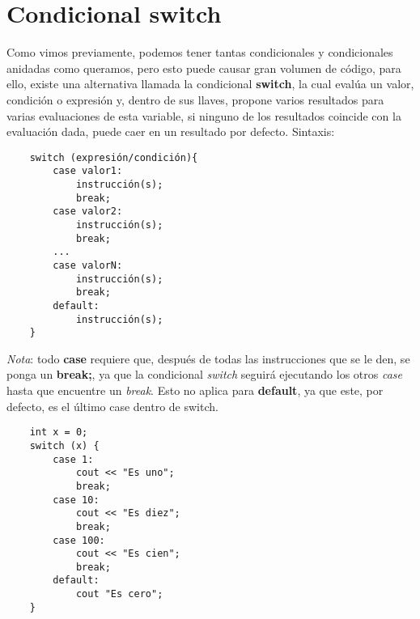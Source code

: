 \section{Condicional switch}
Como vimos previamente, podemos tener tantas condicionales y condicionales anidadas como queramos, pero esto puede causar gran volumen de código, para ello, existe una alternativa llamada la condicional \textbf{switch}, la cual evalúa un valor, condición o expresión y,  dentro de sus llaves, propone varios resultados para varias evaluaciones de esta variable, si ninguno de los resultados coincide con la evaluación dada, puede caer en un resultado por defecto. Sintaxis:
\begin{lstlisting}
    switch (expresión/condición){
        case valor1:
            instrucción(s);
            break;
        case valor2:
            instrucción(s);
            break;
        ...
        case valorN:
            instrucción(s);
            break;
        default:
            instrucción(s);
    }
\end{lstlisting}
\textit{Nota}: todo \textbf{case} requiere que, después de todas las instrucciones que se le den, se ponga un \textbf{break;}, ya que la condicional \textit{switch} seguirá ejecutando los otros \textit{case} hasta que encuentre un \textit{break}. Esto no aplica para \textbf{default}, ya que este, por defecto, es el último case dentro de switch.
\begin{lstlisting}
    int x = 0;
    switch (x) {
        case 1:
            cout << "Es uno";
            break;
        case 10:
            cout << "Es diez";
            break;
        case 100:
            cout << "Es cien";
            break;
        default:
            cout "Es cero";
    }
\end{lstlisting}



